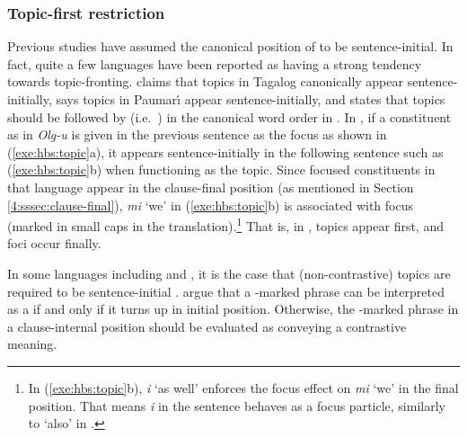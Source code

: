 \subsubsection{Topic-first restriction}
\label{4:sssec:topic-first}

Previous studies have assumed the canonical position of  to be
sentence-initial. In fact, quite a few languages have been reported as
having a strong tendency towards topic-fronting.  \citet{nagaya:07}
claims that topics in Tagalog canonically appear sentence-initially,
\citet{chapman:81} says topics in Paumar{\'{\i}} appear
sentence-initially, and \citet{casielles:03} states that topics should
be followed by  (i.e.\ ) in the canonical word
order in . In , if a
constituent as in \textit{Olg-u} is given in the previous sentence as
the focus as shown in (\ref{exe:hbs:topic}a), it appears
sentence-initially in the following sentence such as
(\ref{exe:hbs:topic}b) when functioning as the topic.
Since focused constituents in that language appear in the clause-final
position (as mentioned in Section \ref{4:sssec:clause-final}), \textit{mi}
`we' in (\ref{exe:hbs:topic}b) is associated with focus (marked in
small caps in the translation).\footnote{In (\ref{exe:hbs:topic}b),
  \textit{i} `as well' enforces the focus effect on \textit{mi} `we'
  in the final position. That means \textit{i} in the sentence behaves
  as a focus particle, similarly to `also' in .} That is,
in , topics appear first, and foci occur
finally.






In some languages including  and , it is the
case that (non-contrastive) topics are required to be sentence-initial
\citep{maki:etal:99,vermeulen:09}.
\citeauthor{maki:etal:99} argue
that a \wa-marked phrase can be interpreted as a  if and only if
it turns up in initial position. Otherwise, the \wa-marked phrase in a
clause-internal position should be evaluated as conveying a
contrastive meaning.

